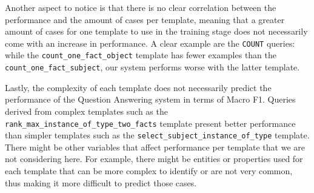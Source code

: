Another aspect to notice is that there is no clear correlation between the performance and the amount 
of cases per template, meaning that a greater amount of cases for one template to use in the training 
stage does not necessarily come with an increase in performance. A clear example are the \texttt{COUNT} 
queries: while the \texttt{count\_one\_fact\_object} template has fewer examples than the 
\texttt{count\_one\_fact\_subject}, our system performs worse with the latter template. 

Lastly, the complexity of each template does not necessarily predict the performance of the Question 
Answering system in terms of Macro F1. Queries derived from complex templates such as the 
\texttt{rank\_max\_instance\_of\_type\_two\_facts} template present better performance than simpler 
templates such as the \texttt{select\_subject\_instance\_of\_type} template. There might be other 
variables that affect performance per template that we are not considering here. For example, there 
might be entities or properties used for each template that can be more complex to identify or are 
not very common, thus making it more difficult to predict those cases.
